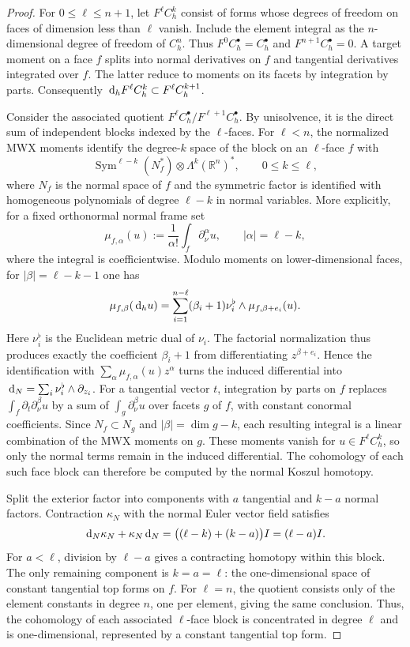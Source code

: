 \documentclass[10pt]{amsart}
\numberwithin{equation}{section}
\newcommand{\dd}{\,{\rm d}}
\begin{document}
\begin{proof}
For $0\leq\ell\leq n+1$, let $F^\ell C_h^k$ consist of forms whose
degrees of freedom on faces of dimension less than $\ell$ vanish.
Include the element integral as the $n$-dimensional degree of freedom
of $C_h^n$. Thus $F^0C_h^\bullet=C_h^\bullet$ and
$F^{n+1}C_h^\bullet=0$.
A target moment on a face $f$ splits into normal derivatives on $f$
and tangential derivatives integrated over $f$. The latter reduce to
moments on its facets by integration by parts. Consequently
$\dd_hF^\ell C_h^k\subset F^\ell C_h^{k+1}$.

Consider the associated quotient $F^\ell C_h^\bullet/F^{\ell+1}C_h^\bullet$.
By unisolvence, it is the direct sum of independent blocks indexed by
the $\ell$-faces. For $\ell<n$, the normalized MWX moments identify the
degree-$k$ space of the block on an $\ell$-face $f$ with
\[
\operatorname{Sym}^{\ell-k}(N_f^*)\otimes
\Lambda^k(\mathbb R^n)^*,\qquad 0\leq k\leq\ell,
\]
where $N_f$ is the normal space of $f$ and the symmetric factor is
identified with homogeneous polynomials of degree $\ell-k$ in normal
variables. More explicitly, for a fixed orthonormal normal frame set
\[
\mu_{f,\alpha}(u):=\frac{1}{\alpha!}\int_f\partial_\nu^\alpha u,
\qquad |\alpha|=\ell-k,
\]
where the integral is coefficientwise. Modulo moments on lower-dimensional
faces, for $|\beta|=\ell-k-1$ one has
\[
\mu_{f,\beta}(\dd_hu)
=\sum_{i=1}^{n-\ell}(\beta_i+1)\nu_i^\flat\wedge
  \mu_{f,\beta+e_i}(u).
\]
Here $\nu_i^\flat$ is the Euclidean metric dual of $\nu_i$.
The factorial normalization thus produces exactly the coefficient
$\beta_i+1$ from differentiating $z^{\beta+e_i}$.
Hence the identification with $\sum_\alpha\mu_{f,\alpha}(u)z^\alpha$
turns the induced differential into
$\dd_N=\sum_i\nu_i^\flat\wedge\partial_{z_i}$.
For a tangential vector $t$, integration by parts on $f$ replaces
$\int_f\partial_t\partial_\nu^\beta u$ by a sum of
$\int_g\partial_\nu^\beta u$ over facets $g$ of $f$, with constant
conormal coefficients. Since $N_f\subset N_g$ and
$|\beta|=\dim g-k$, each resulting integral is a linear combination
of the MWX moments on $g$. These moments vanish for
$u\in F^\ell C_h^k$, so only the normal terms remain in the induced
differential. The cohomology of each such face block can therefore be
computed by the normal Koszul homotopy.

Split the exterior factor into components with $a$ tangential and
$k-a$ normal factors. Contraction $\kappa_N$ with the normal Euler
vector field satisfies
\[
\dd_N\kappa_N+\kappa_N\dd_N
=\bigl((\ell-k)+(k-a)\bigr)I=(\ell-a)I.
\]
For $a<\ell$, division by $\ell-a$ gives a contracting homotopy
within this block. The only remaining component is $k=a=\ell$:
the one-dimensional space of constant tangential top forms on $f$.
For $\ell=n$, the quotient consists only of the element constants in
degree $n$, one per element, giving the same conclusion.
Thus, the cohomology of each associated $\ell$-face block is concentrated
in degree $\ell$ and is one-dimensional, represented by a constant
tangential top form.


\end{proof}
\end{document}
